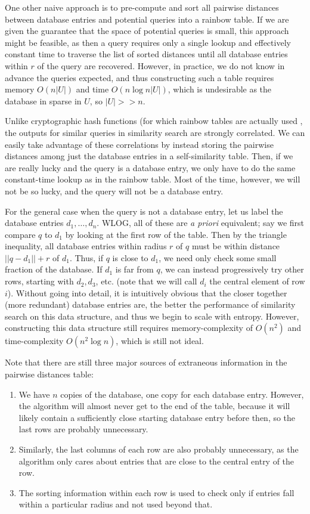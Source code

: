 \documentclass{amsbook}
\theoremstyle{definition}
\theoremstyle{remark}
\numberwithin{equation}{section}
\begin{document}
One other naive approach is to pre-compute and sort all pairwise distances between database entries and potential queries into a rainbow table.
If we are given the guarantee that the space of potential queries is small, this approach might be feasible, as then a query requires only a single lookup and effectively constant time to traverse the list of sorted distances until all database entries within $r$ of the query are recovered.
However, in practice, we do not know in advance the queries expected, and thus constructing such a table requires memory $O(n|U|)$ and time $O(n \log n |U|)$, which is undesirable as the database in sparse in $U$, so $|U| >>n$.

Unlike cryptographic hash functions (for which rainbow tables are actually used \cite{oechslin2003making}, the outputs for similar queries in similarity search are strongly correlated.
We can easily take advantage of these correlations by instead storing the pairwise distances among just the database entries in a self-similarity table.
Then, if we are really lucky and the query is a database entry, we only have to do the same constant-time lookup as in the rainbow table.
Most of the time, however, we will not be so lucky, and the query will not be a database entry.

For the general case when the query is not a database entry, let us label the database entries $d_1, \ldots, d_n$.
WLOG, all of these are \textit{a priori} equivalent; say we first compare $q$ to $d_1$ by looking at the first row of the table.
Then by the triangle inequality, all database entries within radius $r$ of $q$ must be within distance $||q-d_1|| +r$ of $d_1$.
Thus, if $q$ is close to $d_1$, we need only check some small fraction of the database.
If $d_1$ is far from $q$, we can instead progressively try other rows, starting with $d_2, d_3$, etc.
(note that we will call $d_i$ the central element of row $i$).
Without going into detail, it is intuitively obvious that the closer together (more redundant) database entries are, the better the performance of similarity search on this data structure, and thus we begin to scale with entropy.
However, constructing this data structure still requires memory-complexity of $O(n^2)$ and time-complexity $O(n^2 \log n)$, which is still not ideal.

Note that there are still three major sources of extraneous information in the pairwise distances table:

\begin{enumerate}
    \item We have $n$ copies of the database, one copy for each database entry.
However, the algorithm will almost never get to the end of the table, because it will likely contain a sufficiently close starting database entry before then, so the last rows are probably unnecessary.
    \item Similarly, the last columns of each row are also probably unnecessary, as the algorithm only cares about entries that are close to the central entry of the row.
    \item The sorting information within each row is used to check only if entries fall within a particular radius and not used beyond that.
\end{enumerate}
\end{document}
